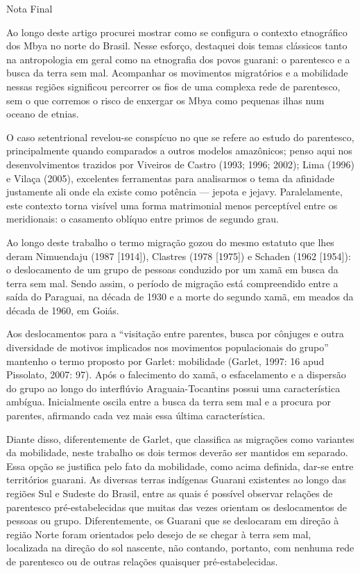 \documentclass{article}
\begin{document}
Nota Final

Ao longo deste artigo procurei mostrar como se configura o contexto
etnogr\'afico dos Mbya no norte do Brasil. Nesse esfor\c{c}o, destaquei
dois temas cl\'assicos tanto na antropologia em geral como na
etnografia dos povos guarani: o parentesco e a busca da terra sem mal.
Acompanhar os movimentos migrat\'orios e a mobilidade nessas regi\~oes
significou percorrer os fios de uma complexa rede de parentesco, sem o
que corremos o risco de enxergar os Mbya como pequenas ilhas num oceano
de etnias.

O caso setentrional revelou-se consp\'icuo no que se refere ao estudo do
parentesco, principalmente quando comparados a outros modelos
amaz\^onicos; penso aqui nos desenvolvimentos trazidos por Viveiros de
Castro (1993; 1996; 2002); Lima (1996) e Vila\c{c}a (2005), excelentes
ferramentas para analisarmos o tema da afinidade justamente ali onde
ela existe como pot\^encia --- jepota e jejavy. Paralelamente, este
contexto torna vis\'ivel uma forma matrimonial menos percept\'ivel
entre os meridionais: o casamento obl\'iquo entre primos de segundo
grau.

Ao longo deste trabalho o termo migra\c{c}\~ao gozou do mesmo estatuto
que lhes deram Nimuendaju (1987 [1914]), Clastres (1978 [1975]) e
Schaden (1962 [1954]): o deslocamento de um grupo de pessoas conduzido
por um xam\~a em busca da terra sem mal. Sendo assim, o per\'iodo de
migra\c{c}\~ao est\'a compreendido entre a sa\'ida do Paraguai, na
d\'ecada de 1930 e a morte do segundo xam\~a, em meados da d\'ecada de
1960, em Goi\'as.

Aos deslocamentos para a {\textquotedblleft}visita\c{c}\~ao entre
parentes, busca por c\^onjuges e outra diversidade de motivos
implicados nos movimentos populacionais do grupo{\textquotedblright}
mantenho o termo proposto por Garlet: mobilidade (Garlet, 1997: 16 apud
Pissolato, 2007: 97). Ap\'os o falecimento do xam\~a, o esfacelamento e
a dispers\~ao do grupo ao longo do interfl\'uvio Araguaia-Tocantins
possui uma caracter\'istica amb\'igua. Inicialmente oscila entre a
busca da terra sem mal e a procura por parentes, afirmando cada vez
mais essa \'ultima caracter\'istica. 

Diante disso, diferentemente de Garlet, que classifica as
migra\c{c}\~oes como variantes da mobilidade, neste trabalho os dois
termos dever\~ao ser mantidos em separado. Essa op\c{c}\~ao se
justifica pelo fato da mobilidade, como acima definida, dar-se entre
territ\'orios guarani. As diversas terras ind\'igenas Guarani
existentes ao longo das regi\~oes Sul e Sudeste do Brasil, entre as
quais \'e poss\'ivel observar rela\c{c}\~oes de parentesco
pr\'e-estabelecidas que muitas das vezes orientam os deslocamentos de
pessoas ou grupo. Diferentemente, os Guarani que se deslocaram em
dire\c{c}\~ao \`a regi\~ao Norte foram orientados pelo desejo de se
chegar \`a terra sem mal, localizada na dire\c{c}\~ao do sol nascente,
n\~ao contando, portanto, com nenhuma rede de parentesco ou de outras
rela\c{c}\~oes quaisquer pr\'e-estabelecidas.
\end{document}
